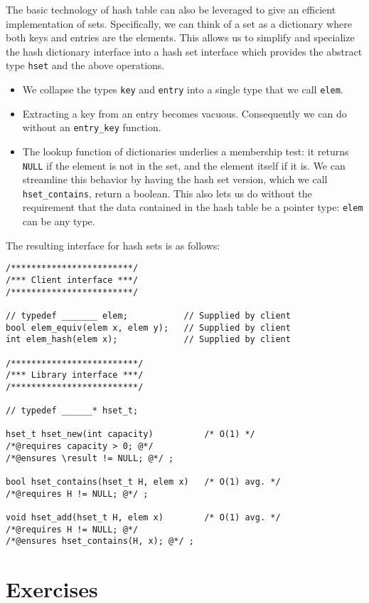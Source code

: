 The basic technology of hash table can also be leveraged to give an
efficient implementation of sets.  Specifically, we can think of a set
as a dictionary where both keys and entries are the elements.  This
allows us to simplify and specialize the hash dictionary interface
into a hash set interface which provides the abstract type
\lstinline'hset' and the above operations.
\begin{itemize}
\item%
  We collapse the types \lstinline'key' and \lstinline'entry' into a
  single type that we call \lstinline'elem'.
\item%
  Extracting a key from an entry becomes vacuous.  Consequently we can
  do without an \lstinline'entry_key' function.
\item%
  The lookup function of dictionaries underlies a membership test: it
  returns \lstinline'NULL' if the element is not in the set, and the
  element itself if it is.  We can streamline this behavior by having
  the hash set version, which we call \lstinline'hset_contains',
  return a boolean.  This also lets us do without the requirement that
  the data contained in the hash table be a pointer type:
  \lstinline'elem' can be any type.
\end{itemize}

The resulting interface for hash sets is as follows:
\begin{lstlisting}[language={[C0]C}]
/************************/
/*** Client interface ***/
/************************/

// typedef _______ elem;           // Supplied by client
bool elem_equiv(elem x, elem y);   // Supplied by client
int elem_hash(elem x);             // Supplied by client

/*************************/
/*** Library interface ***/
/*************************/

// typedef ______* hset_t;

hset_t hset_new(int capacity)          /* O(1) */
/*@requires capacity > 0; @*/
/*@ensures \result != NULL; @*/ ;

bool hset_contains(hset_t H, elem x)   /* O(1) avg. */
/*@requires H != NULL; @*/ ;

void hset_add(hset_t H, elem x)        /* O(1) avg. */
/*@requires H != NULL; @*/
/*@ensures hset_contains(H, x); @*/ ;
\end{lstlisting}



\clearpage
\section{Exercises}
\label{sec:hdict:exercises}

